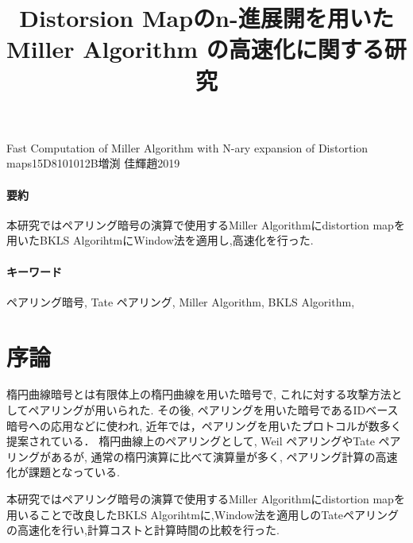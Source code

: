 \documentclass[twocolumn]{jsarticle} %
\begin{document}
\title{Distorsion Mapのn-進展開を用いた \\ Miller Algorithm の高速化に関する研究}{Fast Computation of Miller Algorithm with N-ary expansion of Distortion maps}{15D8101012B}{増渕 佳輝}{趙}{2019}
\vspace{-5cm}
\paragraph{要約}
本研究ではペアリング暗号の演算で使用するMiller Algorithmにdistortion mapを用いたBKLS AlgorihtmにWindow法を適用し,高速化を行った.
\vspace{-2mm}
\paragraph{キーワード}
ペアリング暗号, Tate ペアリング, Miller Algorithm, BKLS Algorithm,
\vspace{-5mm}
\section{序論}


楕円曲線暗号とは有限体上の楕円曲線を用いた暗号で, これに対する攻撃方法としてペアリングが用いられた. その後, ペアリングを用いた暗号であるIDベース暗号への応用などに使われ,
近年では，ペアリングを用いたプロトコルが数多く提案されている．
楕円曲線上のペアリングとして,
Weil ペアリングやTate ペアリングがあるが, 通常の楕円演算に比べて演算量が多く, ペアリング計算の高速化が課題となっている.
\par

本研究ではペアリング暗号の演算で使用するMiller Algorithmにdistortion mapを用いることで改良したBKLS Algorihtmに,Window法を適用しのTateペアリングの高速化を行い,計算コストと計算時間の比較を行った.
\end{document}

